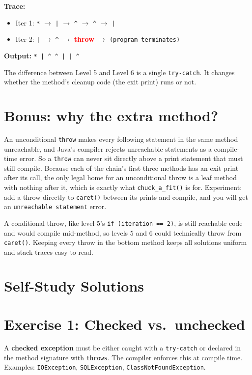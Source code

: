 \documentclass[twoside=false,DIV=14]{scrartcl}
\begin{document}
\textbf{Trace:}
\begin{itemize}
\itemsep0em
\item Iter 1: \texttt{*} $\rightarrow$ \texttt{|} $\rightarrow$ \texttt{\^{}} $\rightarrow$ \texttt{\^{}} $\rightarrow$ \texttt{|}
\item Iter 2: \texttt{|} $\rightarrow$ \texttt{\^{}} $\rightarrow$ \textbf{\textcolor{red}{throw}} $\rightarrow$ \texttt{(program terminates)}
\end{itemize}

\textbf{Output:} \texttt{* | \^{} \^{} | | \^{}}

The difference between Level 5 and Level 6 is a single \texttt{try-catch}.  It changes whether the method's cleanup code (the exit print) runs or not.


\section*{Bonus: why the extra method?}

An unconditional \texttt{throw} makes every following statement in the same method unreachable, and Java's compiler rejects unreachable statements as a compile-time error.  So a \texttt{throw} can never sit directly above a print statement that must still compile.  Because each of the chain's first three methods has an exit print after its call, the only legal home for an unconditional throw is a leaf method with nothing after it, which is exactly what \texttt{chuck\_a\_fit()} is for.  Experiment: add a throw directly to \texttt{caret()} between its prints and compile, and you will get an \texttt{unreachable statement} error.

A conditional throw, like level 5's \texttt{if (iteration == 2)}, is still reachable code and would compile mid-method, so levels 5 and 6 could technically throw from \texttt{caret()}.  Keeping every throw in the bottom method keeps all solutions uniform and stack traces easy to read.


\section*{Self-Study Solutions}

\section*{Exercise 1: Checked vs.\ unchecked}

A \textbf{checked exception} must be either caught with a \texttt{try-catch} or declared in the method signature with \texttt{throws}.  The compiler enforces this at compile time.  Examples: \texttt{IOException}, \texttt{SQLException}, \texttt{ClassNotFoundException}.
\end{document}
